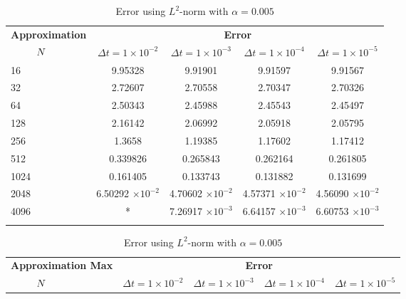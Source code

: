 	\begin{table}[H]
	\begin{tabular}{lcccc}
		\toprule
		\multicolumn{1}{c}{\textbf{Approximation}} & \multicolumn{4}{c}{\textbf{Error}} \\
		$\hspace{9mm}N$ & $\Delta t=1\times 10^{-2}$ & $\Delta t=1\times 10^{-3}$ & $\Delta t=1\times 10^{-4}$ & $\Delta t=1\times 10^{-5}$ \\
		\midrule
		\hspace{7mm} 16 & 9.95328   & 9.91901    & 9.91597    & 9.91567    \\
		\midrule
		\hspace{7mm} 32 & 2.72607   & 2.70558    & 2.70347    & 2.70326    \\
		\midrule
		\hspace{7mm} 64 & 2.50343   & 2.45988    & 2.45543    & 2.45497    \\
		\midrule
		\hspace{7mm} 128 & 2.16142   & 2.06992    & 2.05918    & 2.05795    \\
		\midrule
		\hspace{7mm} 256 & 1.3658    & 1.19385    & 1.17602    & 1.17412    \\
		\midrule
		\hspace{7mm} 512 & 0.339826  & 0.265843   & 0.262164   & 0.261805   \\
		\midrule
		\hspace{7mm} 1024 & 0.161405  & 0.133743   & 0.131882   & 0.131699   \\
		\midrule
		\hspace{7mm} 2048 & 6.50292 $\times 10^{-2}$ & 4.70602 $\times 10^{-2}$ & 4.57371 $\times 10^{-2}$  & 4.56090 $\times 10^{-2}$  \\
		\midrule
		\hspace{7mm} 4096 & * & 7.26917 $\times 10^{-3}$ & 6.64157 $\times 10^{-3}$ & 6.60753 $\times 10^{-3}$ \\
		\\
		\bottomrule
	\end{tabular}
	\caption{Error using $L^2$-norm with $\alpha = 0.005$}
	\label{Galerkin_tabla_L2_alpha=005}
	\vspace{1cm}
	\begin{tabular}{lcccc}
		\toprule
		\multicolumn{1}{c}{\textbf{Approximation Max}} & \multicolumn{4}{c}{\textbf{Error}} \\
		$\hspace{9mm}N$ & $\Delta t=1\times 10^{-2}$ & $\Delta t=1\times 10^{-3}$ & $\Delta t=1\times 10^{-4}$ & $\Delta t=1\times 10^{-5}$ \\

\end{tabular}
\end{table}
